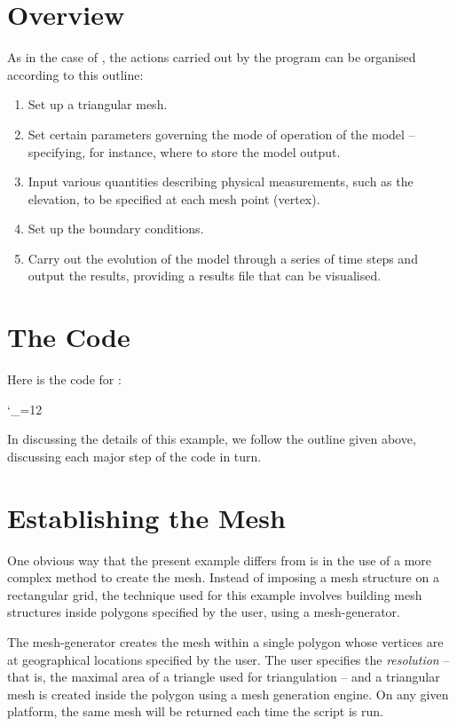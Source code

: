 \documentclass{manual}
\newcommand{\verbatiminputB}[1]{%
\endgroup}
\def\verbatiminputunderscore{\begingroup 
\catcode`\_=12
\verbatiminputB}
\begin{document}
\section{Overview}
As in the case of , the actions carried
out by the program can be organised according to this outline:
\begin{enumerate}
   \item Set up a triangular mesh.

   \item Set certain parameters governing the mode of
         operation of the model -- specifying, for instance, where to store the
         model output.

   \item Input various quantities describing physical measurements, such
         as the elevation, to be specified at each mesh point (vertex).

   \item Set up the boundary conditions.

   \item Carry out the evolution of the model through a series of time
         steps and output the results, providing a results file that can be
         visualised.
\end{enumerate}

\section{The Code}

Here is the code for :

\verbatiminputunderscore{../../anuga_core/examples/cairns/runcairns.py}

In discussing the details of this example, we follow the outline
given above, discussing each major step of the code in turn.

\section{Establishing the Mesh}

One obvious way that the present example differs from
 is in the use of a more complex method to
create the mesh. Instead of imposing a mesh structure on a
rectangular grid, the technique used for this example involves
building mesh structures inside polygons specified by the user,
using a mesh-generator.

The mesh-generator creates the mesh within a single
polygon whose vertices are at geographical locations specified by
the user. The user specifies the \emph{resolution} -- that is, the
maximal area of a triangle used for triangulation -- and a triangular
mesh is created inside the polygon using a mesh generation engine.
On any given platform, the same mesh will be returned each time the
script is run.
\end{document}
